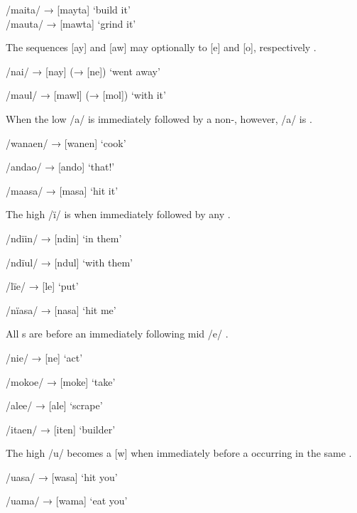 \ea%
    \label{ex:overview:1}
    \ea   /maita/    → [mayta]      ‘build it’\\
    \ex  /mauta/  → [mawta]    ‘grind it’
    \z
\z

The sequences [ay] and [aw] may optionally  to [e] and [o], respectively .

\ea%
    \label{ex:overview:2}
    \ea  /nai/    → [nay]    (→ [ne])    ‘went away’

    \ex  /maul/    → [mawl]    (→ [mol])    ‘with it’
    \z
\z

When the  low  /a/ is immediately followed by a non-, however, /a/ is  .

\ea\label{ex:overview:3}
  \ea  /wanaen/  → [wanen]    ‘cook’

  \ex  /andao/    → [ando]      ‘that!’

  \ex  /maasa/  → [masa]      ‘hit it’
  \z
\z

The  high  /ï/ is  when immediately followed by any  .

\ea\label{ex:overview:4}
    \ea  /ndïin/    → [ndin]      ‘in them’

    \ex  /ndïul/    → [ndul]      ‘with them’

    \ex  /lïe/    → [le]        ‘put’

    \ex  /nïasa/    → [nasa]      ‘hit me’
    \z
\z

All s are  before an immediately following  mid  /e/ .

\ea%
    \label{ex:overview:5}
    \ea  /nie/      → [ne]      ‘act’

    \ex  /mokoe/    → [moke]    ‘take’

    \ex  /alee/      → [ale]    ‘scrape’

    \ex  /itaen/      → [iten]    ‘builder’
    \z
\z

The  high  /u/ becomes a  [w] when immediately before a  occurring in the same  .

\ea%
    \label{ex:overview:6}
    \ea  /uasa/      → [wasa]    ‘hit you’

    \ex  /uama/      → [wama]    ‘eat you’
    \z
\z


